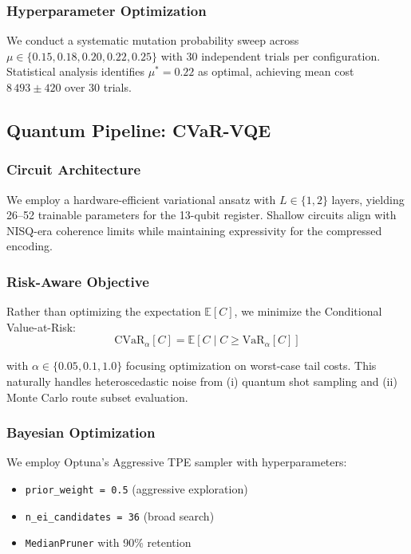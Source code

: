 \subsubsection{Hyperparameter Optimization}
We conduct a systematic mutation probability sweep across $\mu \in \{0.15, 0.18, 0.20, 0.22, 0.25\}$ with 30 independent trials per configuration.
Statistical analysis identifies $\mu^* = 0.22$ as optimal, achieving mean cost $8\,493 \pm 420$ over 30 trials.


\subsection{Quantum Pipeline: CVaR-VQE}

\subsubsection{Circuit Architecture}
We employ a hardware-efficient variational ansatz with $L \in \{1, 2\}$ layers, yielding 26--52 trainable parameters for the 13-qubit register.
Shallow circuits align with NISQ-era coherence limits while maintaining expressivity for the compressed encoding.

\subsubsection{Risk-Aware Objective}
Rather than optimizing the expectation $\mathbb{E}[C]$, we minimize the Conditional Value-at-Risk:
\begin{equation*}
    \text{CVaR}_\alpha[C] = \mathbb{E}[C \mid C \geq \text{VaR}_\alpha[C]]
\end{equation*}


with $\alpha \in \{0.05, 0.1, 1.0\}$ focusing optimization on worst-case tail costs.
This naturally handles heteroscedastic noise from (i) quantum shot sampling and (ii) Monte Carlo route subset evaluation.

\subsubsection{Bayesian Optimization}
We employ Optuna's Aggressive TPE sampler with hyperparameters:
\begin{itemize}
    \item \texttt{prior\_weight = 0.5} (aggressive exploration)
    \item \texttt{n\_ei\_candidates = 36} (broad search)  
    \item \texttt{MedianPruner} with 90\% retention
\end{itemize}


